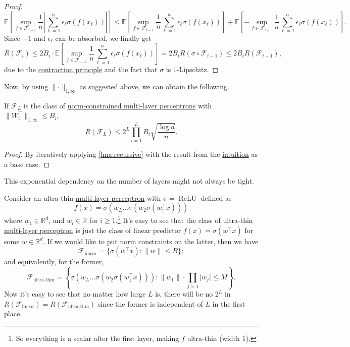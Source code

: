 \begin{proof}
	\[
		\mathbb{E}_{}\left[ \sup _{f\in \mathscr{F} _{i-1}} \frac{1}{n} \left\vert \sum_{\ell = 1}^{n} \epsilon _{\ell } \sigma (f(x_{\ell })) \right\vert \right]
		\leq \mathbb{E}_{}\left[\sup _{f\in \mathscr{F} _{i-1}} \frac{1}{n} \sum_{\ell = 1}^{n} \epsilon _{\ell } \sigma (f(x_{\ell })) \right] + \mathbb{E}_{}\left[-\sup _{f\in \mathscr{F} _{i-1}} \frac{1}{n} \sum_{\ell = 1}^{n} \epsilon _{\ell } \sigma (f(x_{\ell })) \right] .
	\]
	Since \(-1\) and \(\epsilon _{\ell }\) can be absorbed, we finally get
	\[
		R(\mathscr{F} _i)
		\leq 2 B_i \cdot \mathbb{E}_{}\left[\sup _{f\in \mathscr{F} _{i-1}} \frac{1}{n} \sum_{\ell = 1}^{n} \epsilon _{\ell } \sigma (f(x_{\ell })) \right]
		= 2 B_i R(\sigma \circ \mathscr{F} _{i-1})
		\leq 2 B_i R(\mathscr{F} _{i-1}),
	\]
	due to the \hyperref[thm:contraction-principle]{contraction principle} and the fact that \(\sigma \) is \(1\)-Lipschitz.
\end{proof}

Now, by using \(\lVert \cdot \rVert _{1, \infty }\) as suggested above, we can obtain the following.

\begin{corollary}
	If \(\mathscr{F} _L\) is the class of \hyperref[def:norm-MLP]{norm-constrained multi-layer perceptrons} with \(\lVert W_i ^{\top} \rVert _{1, \infty } \leq B_i\),
	\[
		R(\mathscr{F} _L) \leq 2^L \prod _{i=1}^{L} B_i \sqrt{\frac{\log d}{n}} .
	\]
\end{corollary}
\begin{proof}
	By iteratively applying \autoref{lma:recursive} with the result from the \hyperref[int:recursive]{intuition} as a base case.
\end{proof}

This exponential dependency on the number of layers might not always be tight.

\begin{eg}
	Consider an ultra-thin \hyperref[def:MLP]{multi-layer perceptron} with \(\sigma = \operatorname{ReLU}\) defined as
	\[
		f(x) = \sigma (w_L \dots \sigma (w_2 \sigma (w_1 ^{\top} x)))
	\]
	where \(w_1 \in \mathbb{R} ^d\), and \(w_i \in \mathbb{R} \) for \(i \geq 1\).\footnote{So everything is a scalar after the first layer, making \(f\) ultra-thin (width \(1\)).} It's easy to see that the class of ultra-thin \hyperref[def:MLP]{multi-layer perceptron} is just the class of linear predictor \(f(x) = \sigma (w^{\top} x)\) for some \(w\in \mathbb{R} ^d\). If we would like to put norm constraints on the latter, then we have
	\[
		\mathscr{F} _{\text{linear} } = \{ \sigma (w^{\top} x) \colon \lVert w \rVert \leq B \} ;
	\]
	and equivalently, for the former,
	\[
		\mathscr{F} _{\text{ultra-thin} } = \left\{ \sigma (w_L \dots \sigma (w_2 \sigma (w_1 ^{\top} x))) \colon \lVert w_1 \rVert \cdot \prod _{j > 1} \vert w_j \vert \leq M \right\} .
	\]
	Now it's easy to see that no matter how large \(L\) is, there will be no \(2^L\) in \(R(\mathscr{F} _{\text{linear} }) = R(\mathscr{F} _{\text{ultra-thin} })\) since the former is independent of \(L\) in the first place.
\end{eg}

